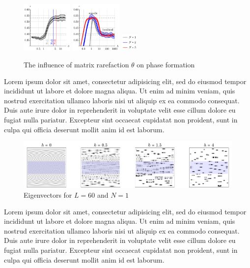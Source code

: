 \begin{figure}[h]
    \centering
    \includegraphics[align=c, width=0.225\textwidth]{imgs/ergodic_reg.pdf}
    \hspace{10 mm} 
    \includegraphics[align=c, width=0.225\textwidth]{imgs/transition.pdf}
    \hspace{5 mm} 
    \includegraphics[align=c, width=0.075\textwidth]{imgs/transition_leg.pdf}
    \caption{
    	The influence of matrix rarefaction $\theta$ on phase formation 
    }
\end{figure}


Lorem ipsum dolor sit amet, consectetur adipisicing elit, sed do eiusmod
tempor incididunt ut labore et dolore magna aliqua. Ut enim ad minim veniam,
quis nostrud exercitation ullamco laboris nisi ut aliquip ex ea commodo
consequat. Duis aute irure dolor in reprehenderit in voluptate velit esse
cillum dolore eu fugiat nulla pariatur. Excepteur sint occaecat cupidatat non
proident, sunt in culpa qui officia deserunt mollit anim id est laborum.

\begin{figure}[h]
    \centering
    \includegraphics{imgs/evecs.pdf}
    \caption{Eigenvectors for $L=60$ and $N=1$}
\end{figure}


Lorem ipsum dolor sit amet, consectetur adipisicing elit, sed do eiusmod
tempor incididunt ut labore et dolore magna aliqua. Ut enim ad minim veniam,
quis nostrud exercitation ullamco laboris nisi ut aliquip ex ea commodo
consequat. Duis aute irure dolor in reprehenderit in voluptate velit esse
cillum dolore eu fugiat nulla pariatur. Excepteur sint occaecat cupidatat non
proident, sunt in culpa qui officia deserunt mollit anim id est laborum.


% 
% 
